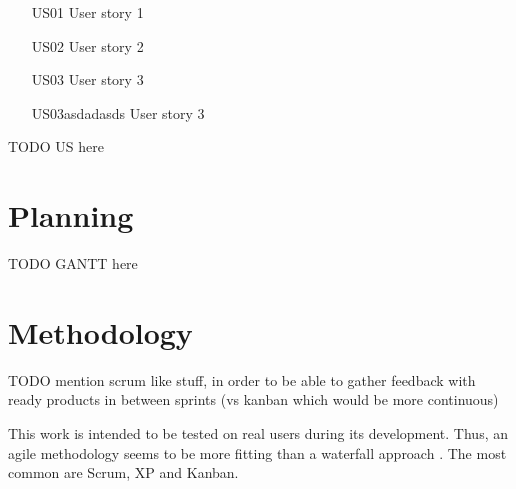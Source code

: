 \begin{itemize}[leftmargin  = 3.25\parindent, align=left]
    \item[US01] User story 1
    \item[US02] User story 2
    \item[US03] User story 3
    \item[US03asdadasds] User story 3
\end{itemize}

TODO
US here

\section{Planning}\label{sec:prob-planning}

TODO
GANTT here

\section{Methodology}\label{sec:prob-methodology}

TODO
mention scrum like stuff, in order to be able to gather feedback with ready products in between sprints (vs kanban which would be more continuous)


This work is intended to be tested on real users during its development. Thus, an agile methodology seems to be more fitting than a waterfall approach \cite{beck2001agile}. The most common are Scrum, XP and Kanban.

